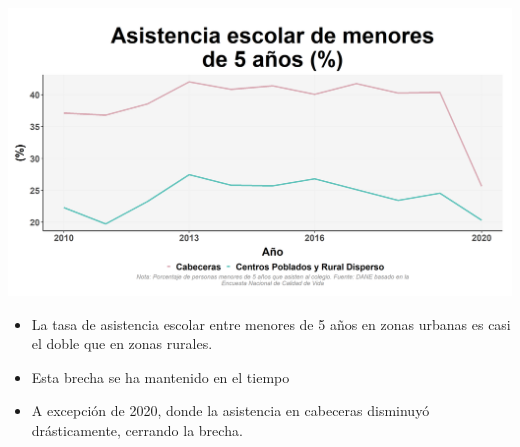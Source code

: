 \documentclass[aspectratio=169]{beamer}
\begin{document}
            \begin{slide}{13} 
                      \begin{imagecolumn}
                \includegraphics[width=\columnwidth]{img/var_100_trend.png}
            \end{imagecolumn}
            \begin{textcolumn}
                \begin{itemize}
                    \item La tasa de asistencia escolar entre menores de 5 años en zonas urbanas es casi el doble que en zonas rurales. 
                    \item Esta brecha se ha mantenido en el tiempo  
                    \item A excepción de 2020, donde la asistencia en cabeceras disminuyó drásticamente, cerrando la brecha.
                \end{itemize}
            \end{textcolumn}

    \printcolumns
    \end{slide}

  
\end{document}
